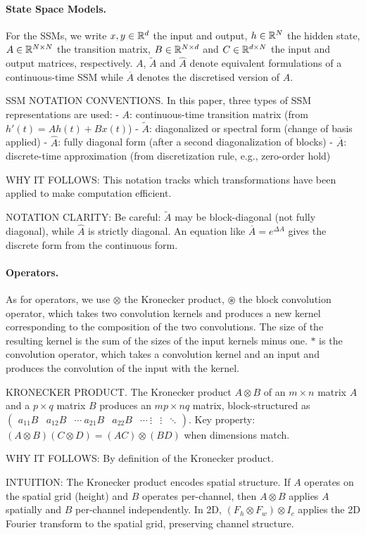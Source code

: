 \documentclass{article}
\begin{document}
\paragraph{State Space Models.} For the SSMs, we write $x, y \in \mathbb{R}^{d}$ the input and output, $h \in \mathbb{R}^{N}$ the hidden state, $A \in \mathbb{R}^{{N}\times {N}}$ the transition matrix, $B \in \mathbb{R}^{N \times d}$ and $C \in \mathbb{R}^{d \times N}$ the input and output matrices, respectively. $A$, $\widetilde{A}$ and $\widehat{A}$ denote equivalent formulations of a continuous-time SSM while $\overline{A}$ denotes the discretised version of $A$.

\begin{thomasbox}
SSM NOTATION CONVENTIONS. In this paper, three types of SSM representations are used:
- $A$: continuous-time transition matrix (from $h'(t) = Ah(t) + Bx(t)$)
- $\widetilde{A}$: diagonalized or spectral form (change of basis applied)
- $\widehat{A}$: fully diagonal form (after a second diagonalization of blocks)
- $\overline{A}$: discrete-time approximation (from discretization rule, e.g., zero-order hold)

WHY IT FOLLOWS: This notation tracks which transformations have been applied to make computation efficient.

NOTATION CLARITY: Be careful: $\widetilde{A}$ may be block-diagonal (not fully diagonal), while $\widehat{A}$ is strictly diagonal. An equation like $\overline{A} = e^{\Delta A}$ gives the discrete form from the continuous form.
\end{thomasbox}

\paragraph{Operators.} As for operators, we use $\otimes$ the Kronecker product, $\circledast$ the block convolution operator, which takes two convolution kernels and produces a new kernel corresponding to the composition of the two convolutions. The size of the resulting kernel is the sum of the sizes of the input kernels minus one. $\ast$ is the convolution operator, which takes a convolution kernel and an input and produces the convolution of the input with the kernel.

\begin{thomasbox}
KRONECKER PRODUCT. The Kronecker product $A \otimes B$ of an $m \times n$ matrix $A$ and a $p \times q$ matrix $B$ produces an $mp \times nq$ matrix, block-structured as $\begin{pmatrix} a_{11}B & a_{12}B & \cdots \ a_{21}B & a_{22}B & \cdots \ \vdots & \vdots & \ddots \end{pmatrix}$. Key property: $(A \otimes B)(C \otimes D) = (AC) \otimes (BD)$ when dimensions match.

WHY IT FOLLOWS: By definition of the Kronecker product.

INTUITION: The Kronecker product encodes spatial structure. If $A$ operates on the spatial grid (height) and $B$ operates per-channel, then $A \otimes B$ applies $A$ spatially and $B$ per-channel independently. In 2D, $(F_h \otimes F_w) \otimes I_c$ applies the 2D Fourier transform to the spatial grid, preserving channel structure.
\end{thomasbox}
\end{document}
